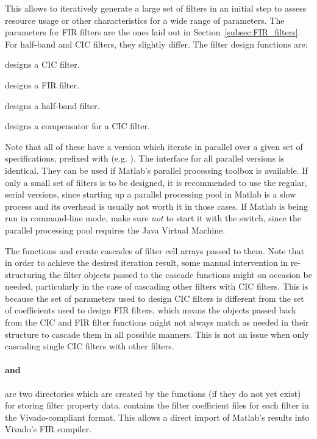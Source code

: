 This  allows to  iteratively generate  a large  set of  filters in  an initial
step  to assess  resource  usage or  other characteristics  for  a wide  range
of  parameters. The parameters  for  FIR  filters are  the  ones  laid out  in
Section~\ref{subsec:FIR_filters}. For half-band and CIC filters, they slightly
differ.  The filter design functions are:
\begin{description}\tightlist
    \item[\code{decCIC.m}] designs a CIC filter.
    \item[\code{decFIR.m}] designs a FIR filter.
    \item[\code{halfbandFIR.m}] designs a half-band filter.
    \item[\code{compCIC.m}] designs a compensator for a CIC filter.
\end{description}
Note that all of  these have a version which iterate in  parallel over a given
set of  specifications, prefixed with   (e.g. ). The
interface for all parallel versions is identical. They can be used if Matlab's
parallel processing toolbox is available. If only a small set of filters is to
be designed,  it is  recommended to  use the  regular, serial  versions, since
starting up  a parallel processing  pool in Matlab is  a slow process  and its
overhead is  usually not  worth it in  those cases. If  Matlab is being run in
command-line mode,  make sure  \emph{not} to start  it with  the 
switch, since the parallel processing pool requires the Java Virtual Machine.

The functions   and   create  cascades of
filter cell arrays  passed to them. Note that in order  to achieve the desired
iteration  result,  some  manual  intervention in  re-structuring  the  filter
objects  passed  to  the  cascade  functions  might  on  occasion  be  needed,
particularly in the case of cascading  other filters with CIC filters. This is
because the set of parameters used to design CIC filters is different from the
set of coefficients used to design FIR filters, which means the objects passed
back from the CIC and FIR filter functions might not always match as needed in
their structure to cascade them in  all possible manners. This is not an issue
when only cascading single CIC filters with other filters.

\paragraph{ and } are  two directories which are
created  by the  functions  (if they  do  not yet  exist)  for storing  filter
property data.  contains the  filter coefficient files for each
filter in the Vivado-compliant  format. This allows a direct import
of Matlab's results into Vivado's FIR compiler.

